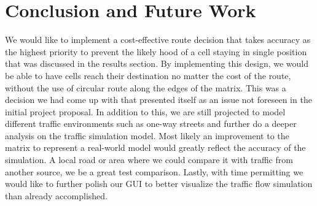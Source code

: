 \documentclass[sigplan,screen]{acmart}
\begin{document}
\section{Conclusion and Future Work}
We would like to implement a cost-effective route decision that takes accuracy
as the highest priority to prevent the likely hood of a cell staying in single
position that was discussed in the results section. By implementing this design,
we would be able to have cells reach their destination no matter the cost of the
route, without the use of circular route along the edges of the matrix. This was
a decision we had come up with that presented itself as an issue not foreseen in
the initial project proposal. In addition to this, we are still projected to
model different traffic environments such as one-way streets and further do a
deeper analysis on the traffic simulation model. Most likely an improvement to
the matrix to represent a real-world model would greatly reflect the accuracy of
the simulation. A local road or area where we could compare it with traffic from
another source, we be a great test comparison. Lastly, with time permitting we
would like to further polish our GUI to better visualize the traffic flow
simulation than already accomplished.



\end{document}
